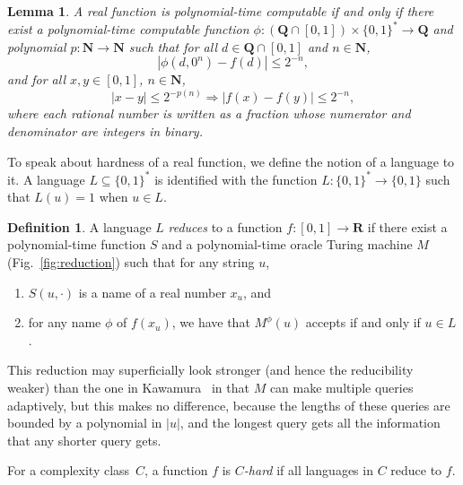 \documentclass[12pt,a4paper]{article}
\newtheorem{lemma}[theorem]{Lemma}
\theoremstyle{definition}
\newtheorem{definition}[theorem]{Definition}
\theoremstyle{remark}
\newcommand{\R}{\mathbf R}
\newcommand{\N}{\mathbf N}
\newcommand{\Q}{\mathbf Q}
\begin{document}
\begin{lemma}
 \label{lem:type1representation}
 A real function is polynomial-time computable if and only if
 there exist a polynomial-time computable function 
 $\phi \colon (\Q \cap [0, 1]) \times \{0, 1\} ^* \to \Q$ and 
 polynomial $p \colon \N \to \N$ such that
 for all $d \in \Q \cap [0,1]$ and $n \in \N$,
 \begin{equation}
  |\phi(d, 0^n) - f(d)| \le 2^{-n},
 \end{equation}
 and for all $x, y \in [0, 1]$, $n \in \N$,
 \begin{equation} 
  |x-y| \le 2^{-p(n)} \Rightarrow |f(x) - f(y)| \le 2^{-n},
   \label{eq:modulus}
 \end{equation}
where each rational number is written
as a fraction whose numerator and denominator
are integers in binary.
\end{lemma}

To speak about hardness of a real function, 
we define the notion of a language to it. 
A language $L \subseteq \{0, 1\} ^*$ is identified with the function 
$L \colon \{0, 1\} ^* \to \{0, 1\}$ such that $L (u) = 1$ when $u \in L$.

\begin{definition} \label{definition: reduction}
 A language $L$ \emph{reduces} to a function $f \colon [0, 1] \to \R$
 if there exist a polynomial-time function $S$ and 
 a polynomial-time oracle Turing machine $M$ (Fig.~\ref{fig:reduction})
 such that for any string $u$, 
  \begin{enumerate}
   \item $S (u, \cdot)$ is a name of a real number $x _u$, and 
   \item for any name $\phi$ of $f (x _u)$, we have that 
    $M ^\phi (u)$ accepts if and only if $u \in L$.
  \end{enumerate}
\end{definition}
This reduction may superficially look stronger (and hence the reducibility weaker) than
the one in Kawamura~\cite{kawamura2010lipschitz} 
in that $M$ can make multiple queries adaptively, 
but this makes no difference, 
because the lengths of these queries 
are bounded by a polynomial in $\lvert u \rvert$, 
and the longest query gets all the information that any shorter query gets. 

For a complexity class~$C$, a function $f$ is \emph{$C$-hard}
if all languages in $C$ reduce to $f$.
\end{document}
